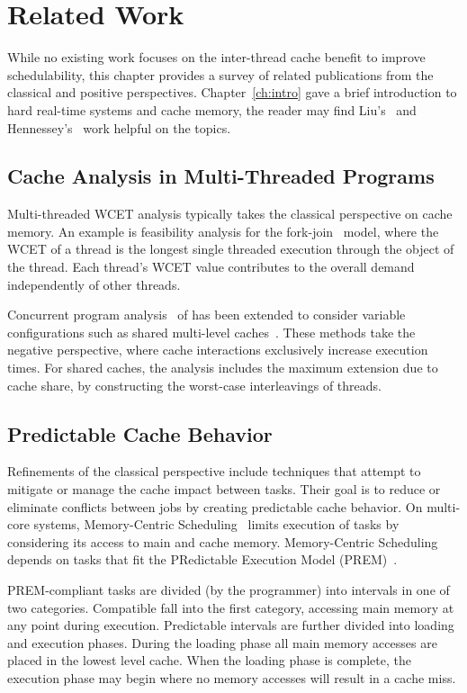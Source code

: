 \chapter{Related Work}\label{ch:related}

While no existing work focuses on the inter-thread cache benefit to
improve schedulability, this chapter provides a survey of
related publications from the classical and positive
perspectives. Chapter~\ref{ch:intro} gave a brief introduction to hard
real-time systems and cache memory, the reader may find   
Liu's~\cite{Liu:2000} and Hennessey's~\cite{Hennessey:2011} work
helpful on the topics.

\section{Cache Analysis in Multi-Threaded Programs}

Multi-threaded WCET analysis typically takes the classical perspective
on cache memory. An example is feasibility analysis for the
fork-join~\cite{Sun:2016} model, where the WCET of a thread is the
longest single threaded execution through the object of the
thread. Each thread's WCET value contributes to the overall demand
independently of other threads.

Concurrent program analysis~\cite{Mittermayr:2012} of has been extended
to consider variable configurations such as shared multi-level
caches~\cite{Li:2009}. These methods take the negative perspective,
where cache interactions exclusively increase execution times. For
shared caches, the analysis includes the maximum extension due to
cache share, by constructing the worst-case interleavings of threads.

\section{Predictable Cache Behavior}

Refinements of the classical perspective include techniques that
attempt to mitigate or manage the cache impact between tasks. Their
goal is to reduce or eliminate conflicts between jobs by creating
predictable cache behavior. On multi-core systems, Memory-Centric
Scheduling~\cite{Bak:2012} limits execution of tasks by considering
its access to main and cache memory. Memory-Centric Scheduling depends
on tasks that fit the PRedictable Execution Model
(PREM)~\cite{Pellizzoni:2011}. 

PREM-compliant tasks are divided (by the programmer) into intervals in
one of two categories. Compatible fall into the first category,
accessing main memory at any point during execution. Predictable
intervals are further divided into loading and execution
phases. During the loading phase all main memory accesses are placed
in the lowest level cache. When the loading phase is complete, the
execution phase may begin where no memory accesses will result in a
cache miss.

